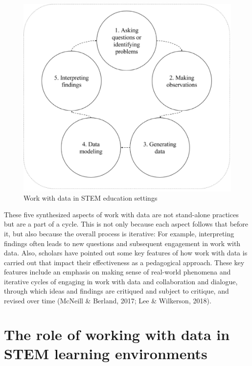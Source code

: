 \documentclass[]{msu-thesis}
\theoremstyle{definition}
\theoremstyle{definition}
\theoremstyle{definition}
\theoremstyle{remark}
\begin{document}
\begin{figure}

{\centering \includegraphics[width=0.8\linewidth]{images/figure1} 

}

\caption{Work with data in STEM education settings}\label{fig:unnamed-chunk-1}
\end{figure}

These five synthesized aspects of work with data are not stand-alone
practices but are a part of a cycle. This is not only because each
aspect follows that before it, but also because the overall process is
iterative: For example, interpreting findings often leads to new
questions and subsequent engagement in work with data. Also, scholars
have pointed out some key features of how work with data is carried out
that impact their effectiveness as a pedagogical approach. These key
features include an emphasis on making sense of real-world phenomena and
iterative cycles of engaging in work with data and collaboration and
dialogue, through which ideas and findings are critiqued and subject to
critique, and revised over time (McNeill \& Berland, 2017; Lee \&
Wilkerson, 2018).

\section{The role of working with data in STEM learning
environments}\label{the-role-of-working-with-data-in-stem-learning-environments}
\end{document}
